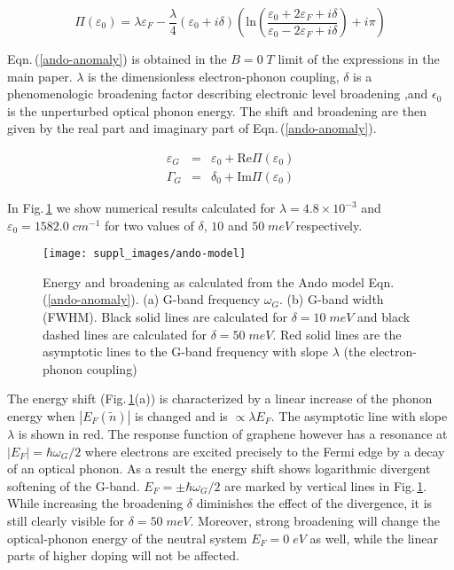\documentclass[pra,aps,superscriptaddress,preprint]{revtex4-1}
\begin{document}
\noindent
\begin{equation}
\label{ando-anomaly}
\Pi(\varepsilon_0) = \lambda \varepsilon_F -\frac{\lambda}{4}\left(\varepsilon_0+i\delta\right)\left(\mathrm{ln}\left(\frac{\varepsilon_0+2\varepsilon_F+i\delta}{\varepsilon_0-2\varepsilon_F+i\delta}\right)+i\pi\right)
\end{equation}

\noindent
Eqn.\,(\ref{ando-anomaly}) is obtained in the $B=0\; T$ limit of the expressions in the main paper. $\lambda$ is the dimensionless electron-phonon coupling, $\delta$ is a phenomenologic broadening factor describing electronic level broadening ,and $\epsilon_0$ is the unperturbed optical phonon energy. The shift and broadening are then given by the real part and imaginary part of Eqn.\,(\ref{ando-anomaly}).

\noindent
\begin{eqnarray}
\label{ando-shift}
\varepsilon_G &=& \varepsilon_0 + \mathrm{Re}\Pi(\varepsilon_0) \\
\Gamma_G &=& \delta_0 + \mathrm{Im}\Pi(\varepsilon_0)
\end{eqnarray}

\noindent
In Fig.\,\ref{ando-model} we show numerical results calculated for $\lambda = 4.8\times 10^{-3}$ and $\varepsilon_0=1582.0\; cm^{-1}$ for two values of $\delta$, $10$ and $50\; meV$ respectively.
\begin{figure}[h]
   \texttt{[image: suppl\_images/ando-model]}
   \caption{\label{ando-model}Energy and broadening as calculated from the Ando model Eqn.\,(\ref{ando-anomaly}). (a) G-band frequency $\omega_G$. (b) G-band width (FWHM). Black solid lines are calculated for $\delta=10\; meV$ and black dashed lines are calculated for $\delta =50\; meV$. Red solid lines are the asymptotic lines to the G-band frequency with slope $\lambda$ (the electron-phonon coupling) }
\end{figure}
The energy shift (Fig.\,\ref{ando-model}(a)) is characterized by a linear increase of the phonon energy when $\left|E_F(\widetilde{n})\right|$ is changed and is $\propto \lambda E_F$. The asymptotic line with slope $\lambda$ is shown in red. The response function of graphene however has a resonance at $|E_F|=\hbar\omega_G /2$ where electrons are excited precisely to the Fermi edge by a decay of an optical phonon.
As a result the energy shift shows logarithmic divergent softening of the G-band. $E_F=\pm \hbar\omega_G /2$ are marked by vertical lines in Fig.\,\ref{ando-model}. While increasing the broadening $\delta$ diminishes the effect of the divergence, it is still clearly visible for $\delta =50\; meV$. Moreover, strong broadening will change the optical-phonon energy of the neutral system $E_F=0\; eV$ as well, while the linear parts of higher doping will not be affected.
\end{document}
